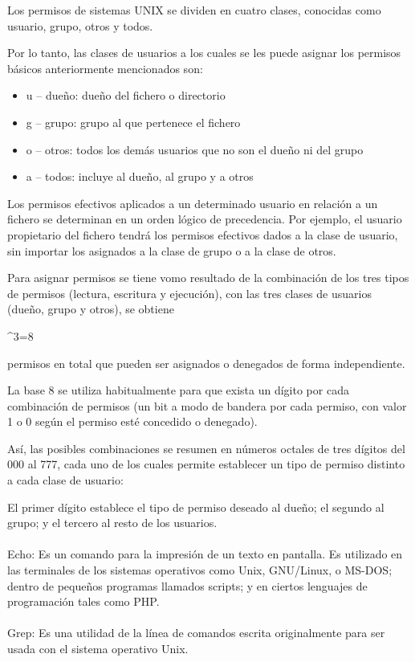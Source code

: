 \documentclass{article}
\begin{document}
Los permisos de sistemas UNIX se dividen en cuatro clases, conocidas como usuario, grupo, otros y todos.

Por lo tanto, las clases de usuarios a los cuales se les puede asignar los permisos básicos anteriormente mencionados son:

\begin{itemize}
\item u – dueño: dueño del fichero o directorio
\item g – grupo: grupo al que pertenece el fichero
\item o – otros: todos los demás usuarios que no son el dueño ni del grupo
\item a – todos: incluye al dueño, al grupo y a otros
\end{itemize}

Los permisos efectivos aplicados a un determinado usuario en relación a un fichero se determinan en un orden lógico de precedencia. Por ejemplo, el usuario propietario del fichero tendrá los permisos efectivos dados a la clase de usuario, sin importar los asignados a la clase de grupo o a la clase de otros.

Para asignar permisos se tiene vomo resultado de la combinación de los tres tipos de permisos (lectura, escritura y ejecución), con las tres clases de usuarios (dueño, grupo y otros), se obtiene

{^{3}=8}

permisos en total que pueden ser asignados o denegados de forma independiente.

La base 8 se utiliza habitualmente para que exista un dígito por cada combinación de permisos (un bit a modo de bandera por cada permiso, con valor 1 o 0 según el permiso esté concedido o denegado).

Así, las posibles combinaciones se resumen en números octales de tres dígitos del 000 al 777, cada uno de los cuales permite establecer un tipo de permiso distinto a cada clase de usuario:

El primer dígito establece el tipo de permiso deseado al dueño; el segundo al grupo; y el tercero al resto de los usuarios.
\\
\\
Echo: Es un comando para la impresión de un texto en pantalla. Es utilizado en las terminales de los sistemas operativos como Unix, GNU/Linux, o MS-DOS; dentro de pequeños programas llamados scripts; y en ciertos lenguajes de programación tales como PHP.
\\
\\
Grep: Es una utilidad de la línea de comandos escrita originalmente para ser usada con el sistema operativo Unix.
\end{document}
